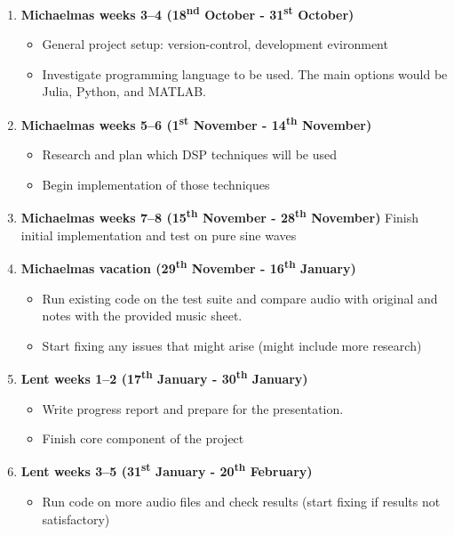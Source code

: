 \documentclass[12pt,a4paper,twoside]{article}
\begin{document}
\begin{enumerate}

\item \textbf{Michaelmas weeks 3--4 (18\textsuperscript{nd} October - 31\textsuperscript{st} October)}
  \begin{itemize}
    \item General project setup: version-control, development evironment
    \item Investigate programming language to be used. The main options would be Julia, Python, and MATLAB.
  \end{itemize}

\item \textbf{Michaelmas weeks 5--6 (1\textsuperscript{st} November - 14\textsuperscript{th} November)}
  \begin{itemize}
    \item Research and plan which DSP techniques will be used
    \item Begin implementation of those techniques
  \end{itemize}

\item \textbf{Michaelmas weeks 7--8 (15\textsuperscript{th} November - 28\textsuperscript{th} November)}
  Finish initial implementation and test on pure sine waves

\item \textbf{Michaelmas vacation (29\textsuperscript{th} November - 16\textsuperscript{th} January)}
  \begin{itemize}
  \item Run existing code on the test suite and compare audio with original and notes with the provided music sheet.
  \item Start fixing any issues that might arise (might include more research)
  \end{itemize}

\item \textbf{Lent weeks 1--2 (17\textsuperscript{th} January - 30\textsuperscript{th} January)}
  \begin{itemize}
    \item Write progress report and prepare for the presentation.
    \item Finish core component of the project
  \end{itemize}

\item \textbf{Lent weeks 3--5 (31\textsuperscript{st} January - 20\textsuperscript{th} February)}
  \begin{itemize}
    \item Run code on more audio files and check results (start fixing if results not satisfactory)
  \end{itemize}


\end{enumerate}
\end{document}
